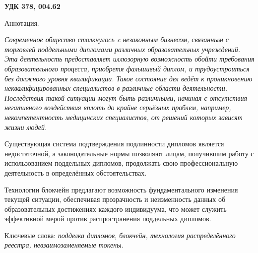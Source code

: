 \documentclass{mirea-article}
\begin{document}
\textbf{УДК 378, 004.62}






Аннотация. {\itshape Современное общество столкнулось c незаконным бизнесом, связанным с торговлей поддельными дипломами различных образовательных учреждений. Эта деятельность предоставляет иллюзорную возможность обойти требования образовательного процесса, приобретя фальшивый диплом, и трудоустроиться без должного уровня квалификации. Такое состояние дел ведёт к проникновению неквалифицированных специалистов в различные области деятельности. Последствия такой ситуации могут быть различными, начиная с отсутствия негативного воздействия вплоть до крайне серьёзных проблем, например, некомпетентность медицинских специалистов, от решений которых зависят жизни людей.
\par Существующая система подтверждения подлинности дипломов является недостаточной, а законодательные нормы позволяют лицам, получившим работу с использованием поддельных дипломов, продолжать свою профессиональную деятельность в определённых обстоятельствах.
\par Технологии блокчейн предлагают возможность фундаментального изменения текущей ситуации, обеспечивая прозрачность и неизменность данных об образовательных достижениях каждого индивидуума, что может служить эффективной мерой против распространения поддельных дипломов.}

Ключевые слова: \textit{подделка дипломов, блокчейн, технология распределённого реестра, невзаимозаменяемые токены.}

\end{document}
